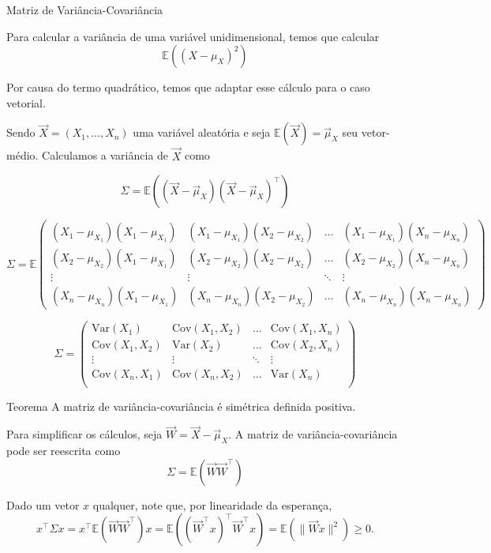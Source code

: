 \documentclass[
  ignorenonframetext,
  aspectratio=169,
]{beamer}
\newcommand{\EE}{\mathbb{E}}
\newcommand{\vX}{\vec{X}}
\newcommand{\vmu}{\vec{\mu}}
\begin{document}
\begin{frame}{Matriz de Variância-Covariância}

  Para calcular a variância de uma variável unidimensional, temos que
  calcular \[\EE((X-\mu_X)^2)\]

  Por causa do termo quadrático, temos que adaptar esse cálculo para o
  caso vetorial.

Sendo \(\vX = (X_1,\ldots,X_n)\) uma variável aleatória e seja
\(\EE(\vX) = \vmu_X\) seu vetor-médio. Calculamos a variância de
\(\vX\) como

\[\Sigma = \EE((\vX-\vmu_X)(\vX-\vmu_X)^\top)\]

\end{frame}

\begin{frame}
\[\Sigma = \EE\begin{pmatrix}  
(X_1 -\mu_{X_1})(X_1 -\mu_{X_1}) & (X_1 -\mu_{X_1})(X_2 -\mu_{X_2}) & \ldots &  (X_1 -\mu_{X_1})(X_n -\mu_{X_n}) \\
(X_2 -\mu_{X_2})(X_1 -\mu_{X_1}) & (X_2 -\mu_{X_2})(X_2 -\mu_{X_2}) & \ldots &  (X_2 -\mu_{X_2})(X_n -\mu_{X_n}) \\
\vdots & \vdots  & \ddots & \vdots \\
(X_n -\mu_{X_n})(X_1 -\mu_{X_1}) & (X_n -\mu_{X_n})(X_2 -\mu_{X_2}) & \ldots & (X_n -\mu_{X_n})(X_n -\mu_{X_n})
\end{pmatrix}\]
\end{frame}

\begin{frame}
\[\Sigma = \begin{pmatrix}  
\text{Var}(X_1) & \text{Cov}(X_1,X_2) & \ldots & \text{Cov}(X_1,X_n)\\
\text{Cov}(X_1,X_2) & \text{Var}(X_2) & \ldots & \text{Cov}(X_2,X_n)\\
\vdots & \vdots  & \ddots & \vdots \\
\text{Cov}(X_n,X_1) & \text{Cov}(X_n,X_2) & \ldots & \text{Var}(X_n)\\
\end{pmatrix}\]
\end{frame}

\begin{frame}
\begin{block}{Teorema}
A matriz de variância-covariância é simétrica definida positiva.
\end{block}

\pause

Para simplificar os cálculos, seja $\vec W = \vX - \vmu_X$. A matriz de variância-covariância pode ser reescrita como
\[\Sigma = \EE(\vec W\vec W^\top)\]

Dado um vetor \(x\) qualquer, note que, por linearidade da esperança,
\[x^\top \Sigma x = x^\top\EE(\vec W\vec W^\top)x = \EE((\vec W^\top x)^\top \vec W^\top x) = \EE(\|\vec W x\|^2) \ge 0.\]
\end{frame}
\end{document}
